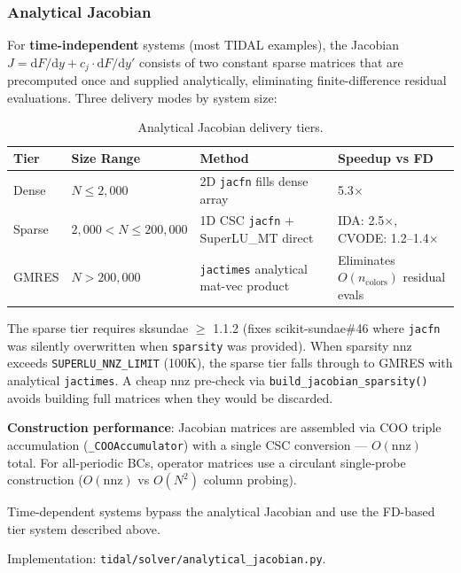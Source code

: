 \subsubsection{Analytical Jacobian}
\label{sec:analytical-jacobian-migration}

For \textbf{time-independent} systems (most TIDAL examples), the Jacobian
$J = \mathrm{d}F/\mathrm{d}y + c_j \cdot \mathrm{d}F/\mathrm{d}y'$ consists of two constant sparse matrices that are
precomputed once and supplied analytically, eliminating finite-difference
residual evaluations. Three delivery modes by system size:

\begin{table}[htbp]
\centering
\caption{Analytical Jacobian delivery tiers.}
\label{tab:jacobian-tiers-migration}
\begin{tabular}{@{}llll@{}}
\toprule
Tier & Size Range & Method & Speedup vs FD \\
\midrule
Dense & $N \leq 2{,}000$ & 2D \texttt{jacfn} fills dense array & 5.3$\times$ \\
Sparse & $2{,}000 < N \leq 200{,}000$ & 1D CSC \texttt{jacfn} + SuperLU\_MT direct & IDA: 2.5$\times$, CVODE: 1.2--1.4$\times$ \\
GMRES & $N > 200{,}000$ & \texttt{jactimes} analytical mat-vec product & Eliminates $O(n_\mathrm{colors})$ residual evals \\
\bottomrule
\end{tabular}
\end{table}

The sparse tier requires sksundae $\geq$ 1.1.2 (fixes
scikit-sundae\#46
where \texttt{jacfn} was silently overwritten when \texttt{sparsity} was provided).
When sparsity nnz exceeds \texttt{SUPERLU\_NNZ\_LIMIT} (100K), the sparse tier falls
through to GMRES with analytical \texttt{jactimes}. A cheap nnz pre-check via
\texttt{build\_jacobian\_sparsity()} avoids building full matrices when they would
be discarded.

\textbf{Construction performance}: Jacobian matrices are assembled via COO triple
accumulation (\texttt{\_COOAccumulator}) with a single CSC conversion --- $O(\mathrm{nnz})$
total. For all-periodic BCs, operator matrices use a circulant single-probe
construction ($O(\mathrm{nnz})$ vs $O(N^2)$ column probing).

Time-dependent systems bypass the analytical Jacobian and use the FD-based
tier system described above.

Implementation: \texttt{tidal/solver/analytical\_jacobian.py}.


